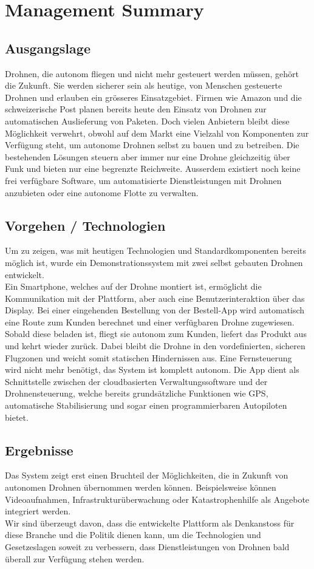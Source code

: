 \newpage
\cleardoublepage
{}
{}
\chapter*{Management Summary}
\section*{Ausgangslage}
Drohnen, die autonom fliegen und nicht mehr gesteuert werden müssen, gehört die Zukunft. Sie werden sicherer sein als heutige, von Menschen gesteuerte Drohnen und erlauben ein grösseres Einsatzgebiet. Firmen wie Amazon und die schweizerische Post planen bereits heute den Einsatz von Drohnen zur automatischen Auslieferung von Paketen. Doch vielen Anbietern bleibt diese Möglichkeit verwehrt, obwohl auf dem Markt eine Vielzahl von Komponenten zur Verfügung steht, um autonome Drohnen selbst zu bauen und zu betreiben. Die bestehenden Lösungen steuern aber immer nur eine Drohne gleichzeitig über Funk und bieten nur eine begrenzte Reichweite. Ausserdem existiert noch keine frei verfügbare Software, um automatisierte Dienstleistungen mit Drohnen anzubieten oder eine autonome Flotte zu verwalten.

\section*{Vorgehen / Technologien}
Um zu zeigen, was mit heutigen Technologien und Standardkomponenten bereits möglich ist, wurde ein Demonstrationssystem mit zwei selbst gebauten Drohnen entwickelt. \\

Ein Smartphone, welches auf der Drohne montiert ist, ermöglicht die Kommunikation mit der Plattform, aber auch eine Benutzerinteraktion über das Display. Bei einer eingehenden Bestellung von der Bestell-App wird automatisch eine Route zum Kunden berechnet und einer verfügbaren Drohne zugewiesen. Sobald diese beladen ist, fliegt sie autonom zum Kunden, liefert das Produkt aus und kehrt wieder zurück. Dabei bleibt die Drohne in den vordefinierten, sicheren Flugzonen und weicht somit statischen Hindernissen aus. Eine Fernsteuerung wird nicht mehr benötigt, das System ist komplett autonom. Die App dient als Schnittstelle zwischen der cloudbasierten Verwaltungssoftware und der Drohnensteuerung, welche bereits grundsätzliche Funktionen wie GPS, automatische Stabilisierung und sogar einen programmierbaren Autopiloten bietet.

\section*{Ergebnisse}
Das System zeigt erst einen Bruchteil der Möglichkeiten, die in Zukunft von autonomen Drohnen übernommen werden können. Beispielsweise können Videoaufnahmen, Infrastrukturüberwachung oder Katastrophenhilfe als Angebote integriert werden. \\

Wir sind überzeugt davon, dass die entwickelte Plattform als Denkanstoss für diese Branche und die Politik dienen kann, um die Technologien und Gesetzeslagen soweit zu verbessern, dass Dienstleistungen von Drohnen bald überall zur Verfügung stehen werden.
